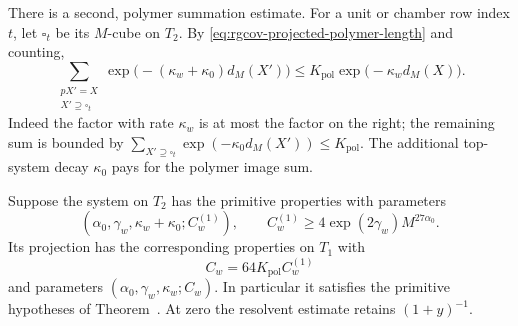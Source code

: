 There is a second, polymer summation estimate. For a
unit or chamber row index $t$, let $\square_t$ be its
$M$-cube on $T_2$. By
\eqref{eq:rgcov-projected-polymer-length} and counting,
\begin{equation}\label{eq:rgcov-polymer-image-sum}
 \sum_{\substack{pX'=X\\X'\supseteq\square_t}}
    \exp\big(-(\kappa_w+\kappa_0)d_M(X')\big)
                 \le K_{\mathrm{pol}}\exp\big(-\kappa_wd_M(X)\big).
\end{equation}
Indeed the factor with rate $\kappa_w$ is at most
the factor on the right; the remaining sum is bounded
by $\sum_{X'\supseteq\square_t}\exp(-\kappa_0d_M(X'))\le K_{\mathrm{pol}}$.
The additional top-system decay $\kappa_0$ pays for the
polymer image sum.

\begin{proposition}\label{prop:rgcov-projected-system}
Suppose the system on $T_2$ has the primitive properties
with parameters
\[
 (\alpha_0,\gamma_w,\kappa_w+\kappa_0;C_w^{(1)}),
 \qquad C_w^{(1)}\ge4\exp(2\gamma_w)M^{27\alpha_0}.
\]
Its projection has the corresponding properties on $T_1$
with
\begin{equation}\label{eq:rgcov-common-constant}
                          C_w=64K_{\mathrm{pol}}C_w^{(1)}
\end{equation}
and parameters $(\alpha_0,\gamma_w,\kappa_w;C_w)$.
In particular it satisfies the primitive hypotheses of
Theorem~.
At zero the resolvent estimate retains $(1+y)^{-1}$.
\end{proposition}

